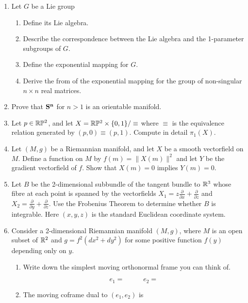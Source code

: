 \begin{enumerate}
\item Let $G$ be a Lie group
\begin{enumerate}
	\item Define its Lie algebra.
	\item Describe the correspondence between the Lie algebra and the
		1-parameter subgroups of $G$.
	\item Define the exponential mapping for $G$.
	\item Derive the from of the exponential mapping for the group of
		non-singular $n \times n$ real matrices.
\end{enumerate}

\item	Prove that ${\bf  S^n}$ for $n > 1$ is an orientable manifold.

\item 	Let $p \in {\Bbb R}{\Bbb P}^2$, and let $X = 
{\Bbb R}{\Bbb P}^2\times \{0,1\}/\equiv$
where $\equiv$ is the equivalence relation generated by $(p,0)\equiv (p,1)$.
Compute in detail $\pi_1(X)$.

\item 	Let $(M,g)$ be a Riemannian manifold, and let $X$ be a smooth 
vectorfield on $M$.  Define a function on $M$ by $f(m) = \| X(m) \|^2$
and let $Y$ be the gradient vectorfield of $f$.  Show that $X(m) = 0$
implies $Y(m) = 0$.

\item 	Let $B$ be the 2-dimensional subbundle of the tangent bundle to
${\Bbb R}^3$ whose fibre at each point is spanned by the vectorfields
$X_1 = z\frac{\partial}{\partial x} + \frac{\partial}{\partial z}$ and
$X_2 = \frac{\partial}{\partial y} + \frac{\partial}{\partial z}$.
Use the Frobenius Theorem to determine whether $B$ is integrable.  Here
$(x,y,z)$ is the standard Euclidean coordinate system.

\item Consider a 2-dimensional Riemannian manifold $(M,g)$, where $M$ is
an open subset of ${\Bbb R}^2$ and $g = f^2(dx^2 + dy^2)$ for some
positive function $f(y)$ depending only on $y$.
\begin{enumerate}
\item Write down the simplest moving orthonormal frame you can think of.

\[ e_1 = \;\;\;\;\;\;\;\;\;\; e_2 = \]

\item The moving coframe dual to $(e_1,e_2)$ is


\end{enumerate}
\end{enumerate}
